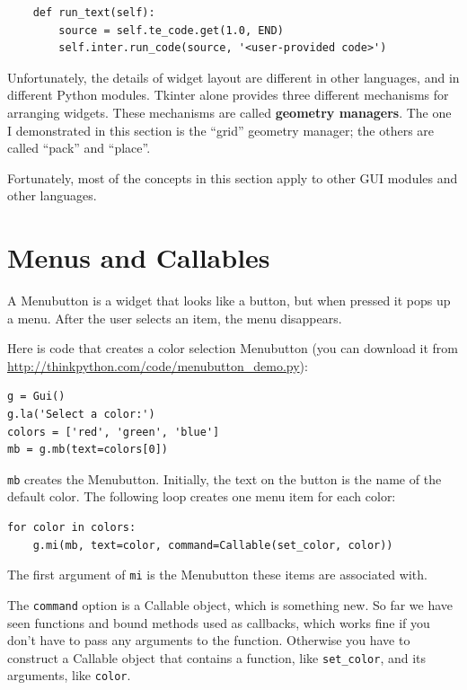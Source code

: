 \documentclass[10pt]{book}
\begin{document}
\begin{verbatim}
    def run_text(self):
        source = self.te_code.get(1.0, END)
        self.inter.run_code(source, '<user-provided code>')
\end{verbatim}
%
Unfortunately, the details of widget layout are different in
other languages, and in different Python modules.
Tkinter alone provides three different mechanisms for arranging
widgets.  These mechanisms are called {\bf geometry managers}.
The one I demonstrated in this section is the ``grid'' geometry
manager; the others are called ``pack'' and ``place''.

Fortunately, most of the concepts in this section apply to
other GUI modules and other languages.


\section{Menus and Callables}

A Menubutton is a widget that looks like a button, but when pressed
it pops up a menu.  After the user selects an item, the menu
disappears.

Here is code that creates a color selection Menubutton
(you can download it from \url{http://thinkpython.com/code/menubutton_demo.py}):

\begin{verbatim}
g = Gui()
g.la('Select a color:')
colors = ['red', 'green', 'blue']
mb = g.mb(text=colors[0])
\end{verbatim}
%
{\tt mb} creates the Menubutton.  Initially, the text on the button is
the name of the default color.  The following loop creates one menu
item for each color:

\begin{verbatim}
for color in colors:
    g.mi(mb, text=color, command=Callable(set_color, color))
\end{verbatim}
%
The first argument of {\tt mi} is the Menubutton these items are
associated with.

The {\tt command} option is a Callable object, which is something new.
So far we have seen functions and bound methods used as callbacks,
which works fine if you don't have to pass any arguments to
the function.  Otherwise you have to construct a Callable object
that contains a function, like \verb"set_color", and its arguments,
like {\tt color}.
\end{document}
